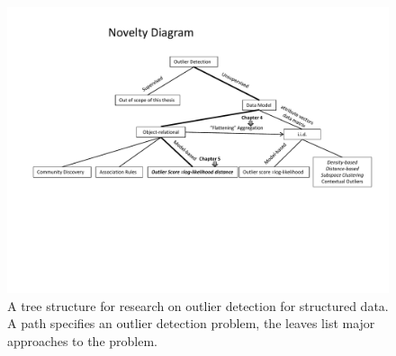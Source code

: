    		\begin{figure}
   			\centering
   			\includegraphics[width=1\textwidth] {figures/all-figures-chapter4-5.pdf}
   			\caption{A tree structure for research on outlier detection for structured data. A path specifies an outlier detection problem, the leaves list major approaches to the problem.
   				\label{fig:chap1-novelty}}
   		\end{figure} 
 
